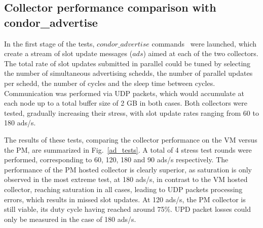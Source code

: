 \documentclass{webofc}
\begin{document}
\subsection{Collector performance comparison with condor\_advertise}
\label{sec:advertise}

In the first stage of the tests, $condor\_advertise$ commands~\cite{advertise} were launched, which create a stream of slot update messages ($ads$) aimed at each of the two collectors. The total rate of slot updates submitted in parallel could be tuned by selecting the number of simultaneous advertising schedds, the number of parallel updates per schedd, the number of cycles and the sleep time between cycles. Communication was performed via UDP packets, which would accumulate at each node up to a total buffer size of 2 GB in both cases. Both collectors were tested, gradually increasing their stress, with slot update rates ranging from 60 to 180 ads/s. 

%
%

%

The results of these tests, comparing the collector performance on the VM versus the PM, are summarized in Fig.~\ref{ad_tests}. A total of 4 stress test rounds were performed, corresponding to 60, 120, 180 and 90 ads/s respectively. The performance of the PM hosted collector is clearly superior, as saturation is only observed in the most extreme test, at 180 ads/s, in contrast to the VM hosted collector, reaching saturation in all cases, leading to UDP packets processing errors, which results in missed slot updates. At 120 ads/s, the PM collector is still viable, its duty cycle having reached around 75\%. UPD packet losses could only be measured in the case of 180 ads/s.  
\end{document}
